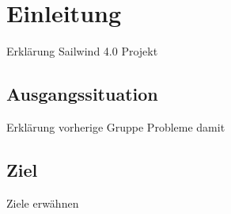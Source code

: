 \section{Einleitung}
Erklärung Sailwind 4.0 Projekt
\subsection{Ausgangssituation}
Erklärung vorherige Gruppe Probleme damit
\subsection{Ziel}
Ziele erwähnen
\newpage



